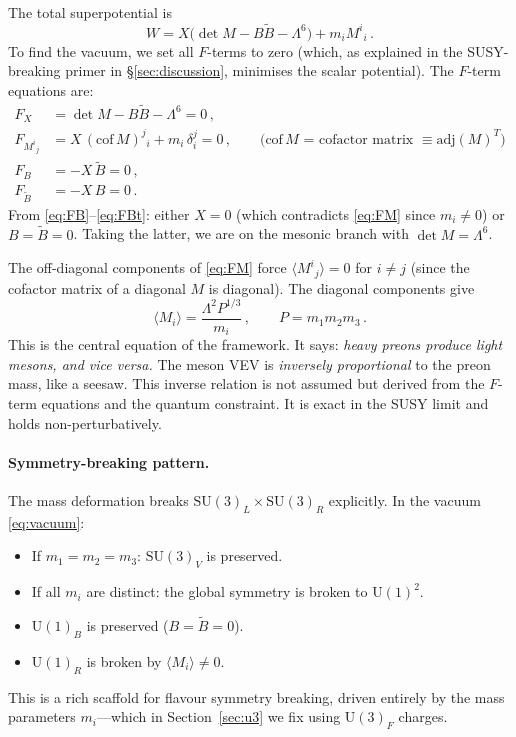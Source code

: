 \documentclass[12pt,a4paper]{article}
\newcommand{\SU}{\mathrm{SU}}
\newcommand{\UU}{\mathrm{U}}
\newcommand{\adj}{\mathrm{adj}}
\begin{document}
The total superpotential is
\begin{equation}
  W = X\bigl(\det M - B\tilde{B} - \Lambda^6\bigr) + m_i M^i{}_i\,.
  \label{eq:Wtot}
\end{equation}
To find the vacuum, we set all $F$-terms to zero (which, as
explained in the SUSY-breaking primer in \S\ref{sec:discussion},
minimises the scalar potential).  The $F$-term equations are:
\begin{align}
  F_X &= \det M - B\tilde{B} - \Lambda^6 = 0\,,
    \label{eq:FX}\\
  F_{M^i{}_j} &= X\,(\text{cof}\,M)^j{}_i + m_i\,\delta^j_i = 0\,,
    \qquad\text{($\text{cof}\,M$ = cofactor matrix $\equiv \adj(M)^T$)}
    \label{eq:FM}\\
  F_B &= -X\,\tilde{B} = 0\,,
    \label{eq:FB}\\
  F_{\tilde{B}} &= -X\,B = 0\,.
    \label{eq:FBt}
\end{align}
From \eqref{eq:FB}--\eqref{eq:FBt}: either $X=0$ (which contradicts
\eqref{eq:FM} since $m_i \neq 0$) or $B = \tilde{B} = 0$. Taking the
latter, we are on the mesonic branch with $\det M = \Lambda^6$.

The off-diagonal components of \eqref{eq:FM} force
$\langle M^i{}_j \rangle = 0$ for $i \neq j$ (since the cofactor
matrix of a diagonal $M$ is diagonal). The diagonal components give
\begin{equation}
  \langle M_i \rangle = \frac{\Lambda^2 P^{1/3}}{m_i}\,,
  \qquad P = m_1 m_2 m_3\,.
  \label{eq:vacuum}
\end{equation}
This is the central equation of the framework. It says:
\emph{heavy preons produce light mesons, and vice versa.}
The meson VEV is \emph{inversely proportional} to the preon mass,
like a seesaw. This inverse relation is not assumed but derived
from the $F$-term equations and the quantum constraint.
It is exact in the SUSY limit and holds non-perturbatively.

\paragraph{Symmetry-breaking pattern.}
The mass deformation breaks $\SU(3)_L \times \SU(3)_R$ explicitly.
In the vacuum \eqref{eq:vacuum}:
\begin{itemize}
  \item If $m_1 = m_2 = m_3$: $\SU(3)_V$ is preserved.
  \item If all $m_i$ are distinct: the global symmetry is broken to
    $\UU(1)^2$.
  \item $\UU(1)_B$ is preserved ($B = \tilde{B} = 0$).
  \item $\UU(1)_R$ is broken by $\langle M_i \rangle \neq 0$.
\end{itemize}
This is a rich scaffold for flavour symmetry breaking, driven entirely
by the mass parameters $m_i$---which in Section~\ref{sec:u3} we fix
using $\UU(3)_F$ charges.
\end{document}
